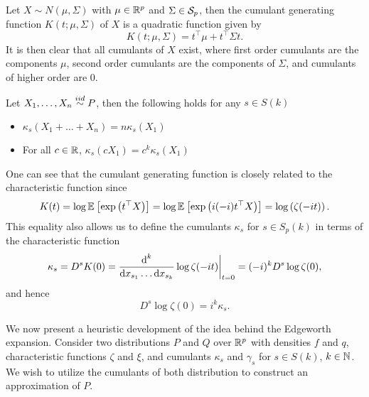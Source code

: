 \begin{example} \label{ex-cumulants-mvn}
    Let $X \sim N(\mu, \Sigma)$ with $\mu \in {\mathbb{R}^p}$ and $\Sigma \in {\mathcal{S}_p}$, then the cumulant generating function $K(t; \mu, \Sigma)$ of $X$ is a quadratic function given by
    \begin{equation*}
        K(t; \mu, \Sigma) = t^\top\mu + t^\top\Sigma t.
    \end{equation*}
    It is then clear that all cumulants of $X$ exist, where first order cumulants are the components $\mu$, second order cumulants are the components of $\Sigma$, and cumulants of higher order are 0.
\end{example}

\begin{lemma}
    Let $X_1, \ldots, X_n \stackrel{iid}{\sim} P$, then the following holds for any $s \in S(k)$
    \begin{itemize}
        \item {
        $\kappa_s(X_1 + \ldots + X_n) = n\kappa_s(X_1)$
        }
        \item {
            For all $c \in \mathbb{R}$, $\kappa_s(c X_1) = c^k\kappa_s(X_1)$
        }
    \end{itemize}
\end{lemma}

\begin{remark}
    One can see that the cumulant generating function is closely related to the characteristic function since
    \begin{equation*}
        K(t) 
        = \log \mathbb{E}_{}\left[\exp\left(t^\top X\right)\right] 
        = \log \mathbb{E}_{}\left[\exp\left(i (-i)t^\top X\right)\right]
        = \log\left(\zeta(-it)\right).
    \end{equation*}
    This equality also allows us to define the cumulants $\kappa_s$ for $s \in S_p(k)$ in terms of the characteristic function
    \begin{equation*}
        \kappa_s = D^s K(0) 
        = \frac{\text{d}^k}{\text{d} x_{s_1} \ldots \text{d} x_{s_k}} \log \zeta(-it) \bigg|_{t=0}
        = (-i)^{k} D^s \log \zeta(0),
    \end{equation*}
    and hence
    \begin{equation*}
        D^s \log \zeta(0) = i^k \kappa_s.
    \end{equation*}
\end{remark}
We now present a heuristic development of the idea behind the Edgeworth expansion. Consider two distributions $P$ and $Q$ over ${\mathbb{R}^p}$ with densities $f$ and $q$, characteristic functions $\zeta$ and $\xi$, and cumulants $\kappa_s$ and $\gamma_s$ for $s \in S(k)$, $k \in \mathbb{N}$. We wish to utilize the cumulants of both distribution to construct an approximation of $P$.

